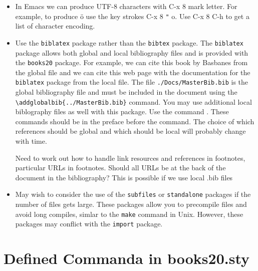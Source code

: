 \begin{itemize}
{  This will be useful when I create \LaTeXe\ files from the database
  which is in UTF-8 encoding.
}

\item In Emacs we can produce UTF-8 characters with C-x 8 mark letter.
  For example, to produce ö use the key strokes C-x 8 \verb|"| o. Use C-x 8 C-h
  to get a list of character encoding.
  
\item {Use the \texttt{biblatex} package rather than the
    \texttt{bibtex} package. The \texttt{biblatex} package allows both
    global and local bibliography files and is provided with the
    \texttt{books20} package.  For example, we can cite this book by
    Basbanes \cite{Basbanes2003} from the global file and we can cite
    this web page with the documentation for the \texttt{biblatex}
    package \cite{Lehman2018} from the local file. The file
    \texttt{./Docs/MasterBib.bib} is the global bibliography file and
    must be included in the document using the
    \verb|\addglobalbib{../MasterBib.bib}| command. You may use
    additional local biblography files as well with this package. Use
    the command \verb||. These commands
    should be in the preface before the \verb||
      command. The choice of which references should be global and
      which should be local will probably change with time.

      Need to work out how to handle link resources and references in
      footnotes, particular URLs in footnotes. Should all URLs be at
      the back of the document in the bibliography?  This is possible
      if we use local .bib files }

\item May wish to consider the use of the \texttt{subfiles} or
  \texttt{standalone} packages if the number of files gets
  large. These packages allow you to precompile files and avoid long
  compiles, simlar to the \texttt{make} command in Unix.  However,
  these packages may conflict with the \texttt{import} package.


\end{itemize}

\section{Defined Commanda in books20.sty}

